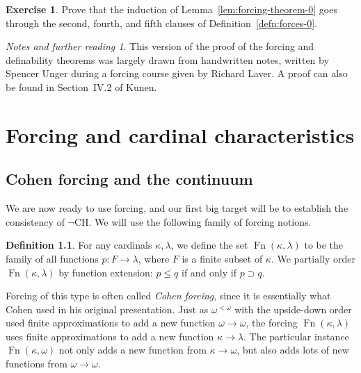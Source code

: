 \documentclass[11pt,oneside,a4paper]{amsbook}
\DeclareMathOperator{\Fn}{Fn}
\theoremstyle{definition}
\newtheorem{exercise}{Exercise}[section]
\theoremstyle{plain}
\theoremstyle{definition}
\newtheorem{definition}[theorem]{Definition}
\theoremstyle{remark}
\newtheorem*{notes}{Notes and further reading}
\numberwithin{equation}{section}
\numberwithin{figure}{section}
\begin{document}
\begin{exercise}
  \label{exerc:forcing-clauses-245}
  Prove that the induction of Lemma~\ref{lem:forcing-theorem-0} goes through the second, fourth, and fifth clauses of Definition~\ref{defn:forces-0}.
\end{exercise}

\begin{notes}
  This version of the proof of the forcing and definability theorems was largely drawn from handwritten notes, written by Spencer Unger during a forcing course given by Richard Laver. A proof can also be found in Section~IV.2 of Kunen.
\end{notes}


\chapter{Forcing and cardinal characteristics}

\section{Cohen forcing and the continuum}

We are now ready to use forcing, and our first big target will be to establish the consistency of $\neg$CH. We will use the following family of forcing notions.

\begin{definition}
  For any cardinals $\kappa,\lambda$, we define the set $\Fn(\kappa,\lambda)$ to be the family of all functions $p\colon F\to\lambda$, where $F$ is a finite subset of $\kappa$. We partially order $\Fn(\kappa,\lambda)$ by function extension: $p\leq q$ if and only if $p\supset q$.
\end{definition}

Forcing of this type is often called \emph{Cohen forcing}, since it is essentially what Cohen used in his original presentation. Just as $\omega^{<\omega}$ with the upside-down order used finite approximations to add a new function $\omega\to\omega$, the forcing $\Fn(\kappa,\lambda)$ uses finite approximations to add a new function $\kappa\to\lambda$. The particular instance $\Fn(\kappa,\omega)$ not only adds a new function from $\kappa\to\omega$, but also adds lots of new functions from $\omega\to\omega$.
\end{document}
